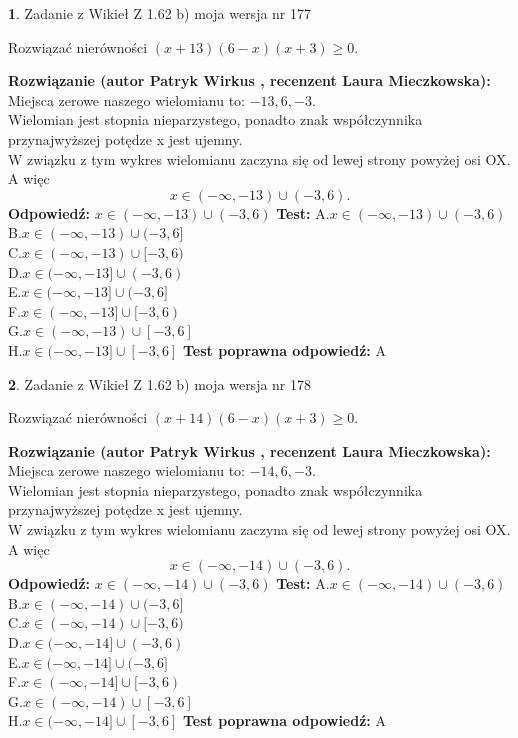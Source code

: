\documentclass[12pt, a4paper]{article}
\theoremstyle{definition} %
\newtheorem{zad}{}
\newcommand{\zadStart}[1]{\begin{zad}#1\newline}
\newcommand{\zadStop}{\end{zad}}
\newcommand{\rozwStart}[2]{\noindent \textbf{Rozwiązanie (autor #1 , recenzent #2): }\newline}
\newcommand{\rozwStop}{\newline}
\newcommand{\odpStart}{\noindent \textbf{Odpowiedź:}\newline}
\newcommand{\odpStop}{\newline}
\newcommand{\testStart}{\noindent \textbf{Test:}\newline}
\newcommand{\testStop}{\newline}
\newcommand{\kluczStart}{\noindent \textbf{Test poprawna odpowiedź:}\newline}
\newcommand{\kluczStop}{\newline}
\begin{document}
\zadStart{Zadanie z Wikieł Z 1.62 b) moja wersja nr 177}

Rozwiązać nierówności $(x+13)(6-x)(x+3)\ge0$.
\zadStop
\rozwStart{Patryk Wirkus}{Laura Mieczkowska}
Miejsca zerowe naszego wielomianu to: $-13, 6, -3$.\\
Wielomian jest stopnia nieparzystego, ponadto znak współczynnika przy\linebreak najwyższej potędze x jest ujemny.\\ W związku z tym wykres wielomianu zaczyna się od lewej strony powyżej osi OX. A więc $$x \in (-\infty,-13) \cup (-3,6).$$
\rozwStop
\odpStart
$x \in (-\infty,-13) \cup (-3,6)$
\odpStop
\testStart
A.$x \in (-\infty,-13) \cup (-3,6)$\\
B.$x \in (-\infty,-13) \cup (-3,6]$\\
C.$x \in (-\infty,-13) \cup [-3,6)$\\
D.$x \in (-\infty,-13] \cup (-3,6)$\\
E.$x \in (-\infty,-13] \cup (-3,6]$\\
F.$x \in (-\infty,-13] \cup [-3,6)$\\
G.$x \in (-\infty,-13) \cup [-3,6]$\\
H.$x \in (-\infty,-13] \cup [-3,6]$
\testStop
\kluczStart
A
\kluczStop



\zadStart{Zadanie z Wikieł Z 1.62 b) moja wersja nr 178}

Rozwiązać nierówności $(x+14)(6-x)(x+3)\ge0$.
\zadStop
\rozwStart{Patryk Wirkus}{Laura Mieczkowska}
Miejsca zerowe naszego wielomianu to: $-14, 6, -3$.\\
Wielomian jest stopnia nieparzystego, ponadto znak współczynnika przy\linebreak najwyższej potędze x jest ujemny.\\ W związku z tym wykres wielomianu zaczyna się od lewej strony powyżej osi OX. A więc $$x \in (-\infty,-14) \cup (-3,6).$$
\rozwStop
\odpStart
$x \in (-\infty,-14) \cup (-3,6)$
\odpStop
\testStart
A.$x \in (-\infty,-14) \cup (-3,6)$\\
B.$x \in (-\infty,-14) \cup (-3,6]$\\
C.$x \in (-\infty,-14) \cup [-3,6)$\\
D.$x \in (-\infty,-14] \cup (-3,6)$\\
E.$x \in (-\infty,-14] \cup (-3,6]$\\
F.$x \in (-\infty,-14] \cup [-3,6)$\\
G.$x \in (-\infty,-14) \cup [-3,6]$\\
H.$x \in (-\infty,-14] \cup [-3,6]$
\testStop
\kluczStart
A
\kluczStop
\end{document}
